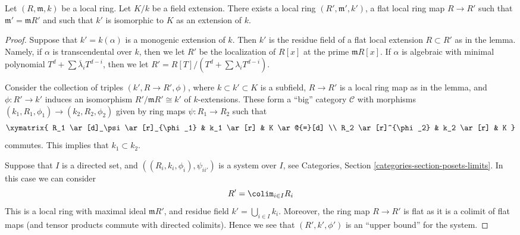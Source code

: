 \begin{lemma}
\label{lemma-flat-local-given-residue-field}
Let $(R, \mathfrak m, k)$ be a local ring. Let $K/k$ be a field
extension. There exists a local ring $(R', \mathfrak m', k')$, a flat local
ring map $R \to R'$ such that $\mathfrak m' = \mathfrak mR'$ and such that
$k'$ is isomorphic to $K$ as an extension of $k$.
\end{lemma}

\begin{proof}
Suppose that $k' = k(\alpha)$ is a monogenic extension of $k$.
Then $k'$ is the residue field of a flat local extension $R \subset R'$
as in the lemma. Namely, if $\alpha$ is transcendental over $k$, then we let
$R'$ be the localization of $R[x]$ at the prime $\mathfrak mR[x]$.
If $\alpha$ is algebraic with minimal polynomial
$T^d + \sum \overline{\lambda}_iT^{d - i}$, then we let
$R' = R[T]/(T^d + \sum \lambda_i T^{d - i})$.

\medskip\noindent
Consider the collection of triples $(k', R \to R', \phi)$, where
$k \subset k' \subset K$ is a subfield,
$R \to R'$ is a local ring map as in the lemma, and
$\phi : R' \to k'$ induces an isomorphism $R'/\mathfrak mR' \cong k'$
of $k$-extensions. These form a ``big'' category $\mathcal{C}$ with morphisms
$(k_1, R_1, \phi_1) \to (k_2, R_2, \phi_2)$
given by ring maps $\psi : R_1 \to R_2$ such that
$$
\xymatrix{
R_1 \ar[d]_\psi \ar[r]_{\phi_1} & k_1 \ar[r] & K \ar@{=}[d] \\
R_2 \ar[r]^{\phi_2} & k_2 \ar[r] & K
}
$$
commutes. This implies that $k_1 \subset k_2$.

\medskip\noindent
Suppose that $I$ is a directed set, and
$((R_i, k_i, \phi_i), \psi_{ii'})$ is a system over $I$, see
Categories, Section \ref{categories-section-posets-limits}.
In this case we can consider
$$
R' = \colim_{i \in I} R_i
$$
This is a local ring with maximal ideal $\mathfrak mR'$, and
residue field $k' = \bigcup_{i \in I} k_i$. Moreover, the ring
map $R \to R'$ is flat as it is a colimit of flat maps (and tensor
products commute with directed colimits).
Hence we see that $(R', k', \phi')$ is an ``upper bound'' for the system.


\end{proof}
